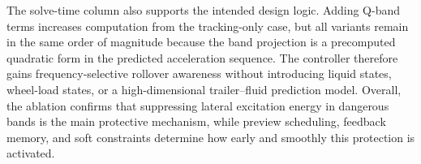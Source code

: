 The solve-time column also supports the intended design logic. Adding Q-band terms increases computation from the tracking-only case, but all variants remain in the same order of magnitude because the band projection is a precomputed quadratic form in the predicted acceleration sequence. The controller therefore gains frequency-selective rollover awareness without introducing liquid states, wheel-load states, or a high-dimensional trailer--fluid prediction model. Overall, the ablation confirms that suppressing lateral excitation energy in dangerous bands is the main protective mechanism, while preview scheduling, feedback memory, and soft constraints determine how early and smoothly this protection is activated.
